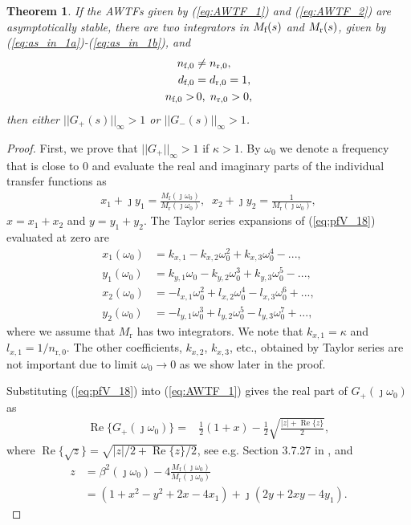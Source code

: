 \documentclass[10pt,twocolumn,twoside]{IEEEtran}
\newtheorem{theorem}{Theorem}
\theoremstyle{definition}
\begin{document}
\begin{theorem}\label{thm:two_integrators_Mf_Mr}
If the AWTFs given by (\ref{eq:AWTF_1}) and (\ref{eq:AWTF_2}) are asymptotically stable, there are two integrators in $M_{\textnormal{f}}(s)$ and $M_{\textnormal{r}}(s)$, given by (\ref{eq:as_in_1a})-(\ref{eq:as_in_1b}), and
  \begin{align}
  n_{\textnormal{f},0} &\neq n_{\textnormal{r},0},\label{eq:as_in_2a}\\
  d_{\textnormal{f},0} &= d_{\textnormal{r},0} = 1,\label{eq:as_in_2b}\\
  n_{\textnormal{f},0} >&\, 0,\; n_{\textnormal{r},0}>0,\label{eq:as_in_2c}
  \end{align}
  then either $||G_+(s)||_{\infty} > 1$ or $||G_-(s)||_{\infty} > 1$.
\end{theorem}
\begin{proof}
First, we prove that $||G_+||_{\infty}>1$ if $\kappa>1$. By $\omega_0$ we denote a frequency that is close to $0$ and evaluate the real and imaginary parts of the individual transfer functions as
\begin{align}
  x_1 + \jmath y_1 = \frac{M_{\text{f}}(\jmath\omega_0)}{M_{\text{r}}(\jmath\omega_0)},\;\; x_2 + \jmath y_2 = \frac{1}{M_{\text{r}}(\jmath\omega_0)},\label{eq:pfV_18}
\end{align}
$x = x_1+x_2$ and $y = y_1+y_2$. The Taylor series expansions of (\ref{eq:pfV_18}) evaluated at zero are
\begin{align}
x_1(\omega_0) &= k_{x,1} - k_{x,2}\omega_0^2 + k_{x,3}\omega_0^4 - ...,\label{eq:pfV_19a}\\
y_1(\omega_0) &= k_{y,1}\omega_0 - k_{y,2}\omega_0^3 + k_{y,3}\omega_0^5 - ...,\label{eq:pfV_19b}\\
x_2(\omega_0) &= -l_{x,1}\omega_0^2 + l_{x,2} \omega_0^4 - l_{x,3}\omega_0^6 + ...,\label{eq:pfV_19c}\\
y_2(\omega_0) &= - l_{y,1}\omega_0 ^3 + l_{y,2}\omega_0^5 - l_{y,3}\omega_0^7 +  ...,\label{eq:pfV_19d}
\end{align}
where we assume that $M_{\text{r}}$ has two integrators. We note that $k_{x,1} = \kappa$ and $l_{x,1} = 1 / n_{\text{r},0}$. The other coefficients, $k_{x,2}$, $k_{x,3}$, etc., obtained by Taylor series are not important due to limit $\omega_0 \rightarrow 0$ as we show later in the proof.

Substituting (\ref{eq:pfV_18}) into (\ref{eq:AWTF_1}) gives the real part of $G_+(\jmath\omega_0)$ as
\begin{align}
    \operatorname{Re}\{G_+(\jmath\omega_0)\} =& \frac{1}{2}\left(1+x\right)
    -\frac{1}{2}\sqrt{\frac{|z|+\operatorname{Re}\{z\}}{2}},\label{eq:pfV_20}
\end{align}
where $\operatorname{Re}\{\sqrt{z}\} = \sqrt{|z|/2+\operatorname{Re}\{z\}/2}$, see e.g. Section 3.7.27 in \cite{Abramowitz1964}, and
\begin{align}
  z &= \beta^2(\jmath \omega_0)-4\frac{M_{\text{f}}(\jmath \omega_0)}{M_{\text{r}}(\jmath \omega_0)}\nonumber\\
&=(1+x^2-y^2+2x-4x_1) + \jmath(2y+2xy-4y_1).\label{eq:pfV_21}
\end{align}


\end{proof}
\end{document}
